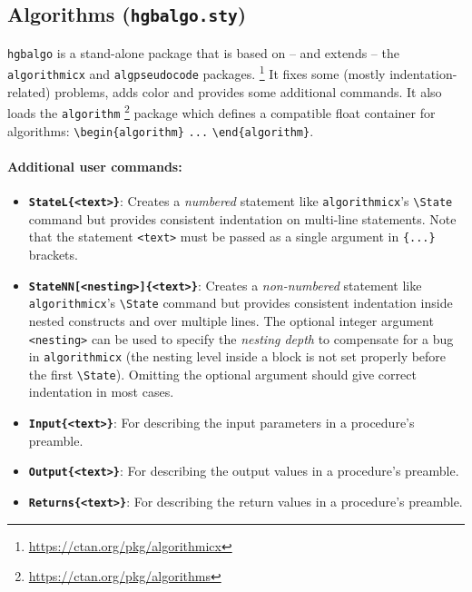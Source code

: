 \documentclass[english]{hgbarticle}
\begin{document}
\subsection{Algorithms (\texttt{hgbalgo.sty})}

\texttt{hgbalgo} is a stand-alone package that is based on -- and extends -- the \texttt{algorithmicx} and 
\texttt{algpseudocode} packages.%
\footnote{\url{https://ctan.org/pkg/algorithmicx}}
It fixes some (mostly indentation-related) problems, adds color and provides some additional
commands. It also loads the \texttt{algorithm}%
\footnote{\url{https://ctan.org/pkg/algorithms}}
package which defines a compatible float container for algorithms:
\verb!\begin{algorithm}! \verb!...! \verb!\end{algorithm}!.


\paragraph{Additional user commands:}
\begin{itemize}
\item 
\textbf{\texttt{{\bs}StateL\{<text>\}}}: Creates a \emph{numbered} statement like \texttt{algorithmicx}'s 
\verb!\State! command but provides consistent indentation on multi-line statements.
Note that the statement \texttt{<text>} must be passed as a single argument in \verb!{...}! brackets.
\item
\textbf{\texttt{{\bs}StateNN[<nesting>]\{<text>\}}}: 
Creates a \emph{non-numbered} statement like \texttt{algorith\-micx}'s \verb!\State! 
command but provides consistent indentation inside nested constructs and over multiple lines.
The optional integer argument \verb!<nesting>! can be used to specify the \emph{nesting depth}
to compensate for a bug in \texttt{algorithmicx} (the nesting level inside a block is not set properly before 
the first \verb!\State!). Omitting the optional argument should give correct indentation in most
cases.
\item
\textbf{\texttt{{\bs}Input\{<text>\}}}:
For describing the input parameters in a procedure's preamble. %
\item
\textbf{\texttt{{\bs}Output\{<text>\}}}:
For describing the output values in a procedure's preamble. %
\item
\textbf{\texttt{{\bs}Returns\{<text>\}}}:
For describing the return values in a procedure's preamble. %
\end{itemize}
\end{document}
